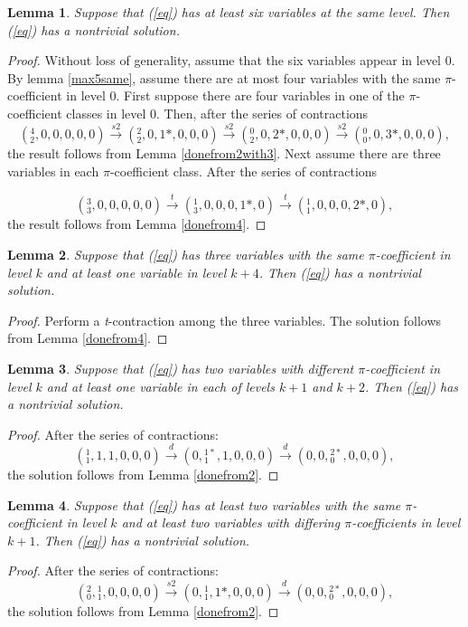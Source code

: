 \documentclass{article}
\newtheorem{lemma}{Lemma}
\begin{document}
\begin{lemma}\label{max6}
Suppose that (\ref{eq}) has at least six variables at the same level.  Then (\ref{eq}) has a nontrivial solution.
\end{lemma}
\begin{proof}
Without loss of generality, assume that the six variables appear in level 0.  By lemma \ref{max5same}, assume there are at most four variables with the same $\pi$-coefficient in level 0.  First suppose there are four variables in one of the $\pi$-coefficient classes in level 0.  Then, after the series of contractions
$$(^{4}_{2},0,0,0,0,0) \xrightarrow{s2}
(^{2}_{2},0,1*,0,0,0) \xrightarrow{s2}
(^{0}_{2},0,2*,0,0,0) \xrightarrow{s2}
(^{0}_{0},0,3*,0,0,0),$$
the result follows from Lemma \ref{donefrom2with3}.  Next assume there are three variables in each $\pi$-coefficient class.  After the series of contractions 

$$(^{3}_{3},0,0,0,0,0) \xrightarrow{t}
(^{1}_{3},0,0,0,1*,0) \xrightarrow{t}
(^{1}_{1},0,0,0,2*,0),$$
the result follows from Lemma \ref{donefrom4}.
\end{proof}

\begin{lemma} \label{doneaftert}
Suppose that (\ref{eq}) has three variables with the same $\pi$-coefficient in level $k$ and at least one variable in level $k+4$.  Then (\ref{eq}) has a nontrivial solution.
\end{lemma}
\begin{proof}
Perform a \textit{t}-contraction among the three variables.  The solution follows from Lemma \ref{donefrom4}.
\end{proof}

\begin{lemma} \label{doneafterd}
Suppose that (\ref{eq}) has two variables with different $\pi$-coefficient in level $k$ and at least one variable in each of levels $k+1$ and $k+2$.  Then (\ref{eq}) has a nontrivial solution.
\end{lemma}
\begin{proof}

After the series of contractions: $$(^{1}_{1},1,1,0,0,0) \xrightarrow{d}
(0,{}^{1*}_{1},1,0,0,0) \xrightarrow{d}
(0,0,{}^{2*}_{0},0,0,0),$$
the solution follows from Lemma \ref{donefrom2}.
\end{proof}

\begin{lemma} \label{doneafterds2}
Suppose that (\ref{eq}) has at least two variables with the same $\pi$-coefficient in level $k$ and at least two variables with differing $\pi$-coefficients in level $k+1$.  Then (\ref{eq}) has a nontrivial solution.
\end{lemma}
\begin{proof}
After the series of contractions:
$$(^{2}_{0},{}^{1}_{1},0,0,0,0) \xrightarrow{s2}
(0,{}^{1}_{1},1*,0,0,0) \xrightarrow{d}
(0,0,{}^{2*}_{0},0,0,0),$$
the solution follows from Lemma \ref{donefrom2}.
\end{proof}
\end{document}
